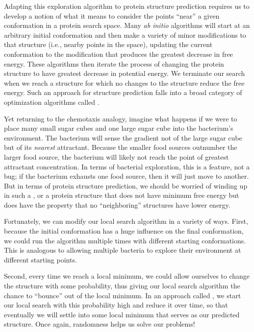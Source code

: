 Adapting this exploration algorithm to protein structure prediction requires us to develop a notion of what it means to consider the points ``near'' a given conformation in a protein search space. Many \textit{ab initio} algorithms will start at an arbitrary initial conformation and then make a variety of minor modifications to that structure (i.e., nearby points in the space), updating the current conformation to the modification that produces the greatest decrease in free energy. These algorithms then iterate the process of changing the protein structure to have greatest decrease in potential energy. We terminate our search when we reach a structure for which no changes to the structure reduce the free energy. Such an approach for structure prediction falls into a broad category of optimization algorithms called .

Yet returning to the chemotaxis analogy, imagine what happens if we were to place many small sugar cubes and one large sugar cube into the bacterium's environment. The bacterium will sense the gradient not of the large sugar cube but of its \textit{nearest} attractant. Because the smaller food sources outnumber the larger food source, the bacterium will likely not reach the point of greatest attractant concentration. In terms of bacterial exploration, this is a feature, not a bug; if the bacterium exhausts one food source, then it will just move to another. But in terms of protein structure prediction, we should be worried of winding up in such a , or a protein structure that does not have minimum free energy but does have  the property that no ``neighboring'' structures have lower energy.\\

\begin{qbox}\end{qbox}

Fortunately, we can modify our local search algorithm in a variety of ways. First, because the initial conformation has a huge influence on the final conformation, we could run the algorithm multiple times with different starting conformations. This is analogous to allowing multiple bacteria to explore their environment at different starting points.

Second, every time we reach a local minimum, we could allow ourselves to change the structure with some probability, thus giving our local search algorithm the chance to ``bounce'' out of the local minimum. In an approach called , we start our local search with this probability high and reduce it over time, so that eventually we will settle into some local minimum that serves as our predicted structure. Once again, randomness helps us solve our problems!

